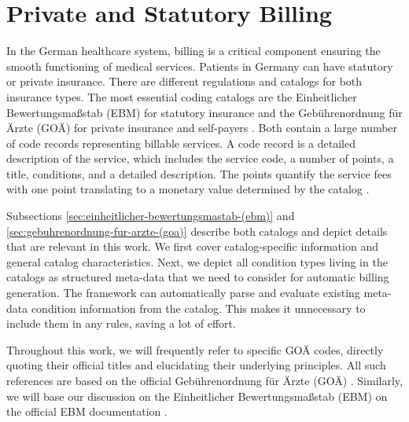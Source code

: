 \chapter{Private and Statutory Billing}\label{ch:billing-in-the-german-healthcare-system}

In the German healthcare system, billing is a critical component ensuring the smooth functioning of medical services.
Patients in Germany can have statutory or private insurance.
There are different regulations and catalogs for both insurance types.
The most essential coding catalogs are the Einheitlicher Bewertungsmaßstab (EBM) for statutory insurance and the Gebührenordnung für Ärzte (GOÄ) for private insurance and self-payers \cite{Stausberg1998}.
Both contain a large number of code records representing billable services.
A code record is a detailed description of the service, which includes the service code, a number of points, a title, conditions, and a detailed description.
The points quantify the service fees with one point translating to a monetary value determined by the catalog \cite{Stausberg1998}.

Subsections \ref{sec:einheitlicher-bewertungsmastab-(ebm)} and \ref{sec:gebuhrenordnung-fur-arzte-(goa)} describe both catalogs and depict details that are relevant in this work.
We first cover catalog-specific information and general catalog characteristics.
Next, we depict all condition types living in the catalogs as structured meta-data that we need to consider for automatic billing generation.
The framework can automatically parse and evaluate existing meta-data condition information from the catalog.
This makes it unnecessary to include them in any rules, saving a lot of effort.

Throughout this work, we will frequently refer to specific GOÄ codes, directly quoting their official titles and elucidating their underlying principles.
All such references are based on the official Gebührenordnung für Ärzte (GOÄ) \cite{bruck1998kommentar}.
Similarly, we will base our discussion on the Einheitlicher Bewertungsmaßstab (EBM) on the official EBM documentation \cite{hermanns2015ebm}.



